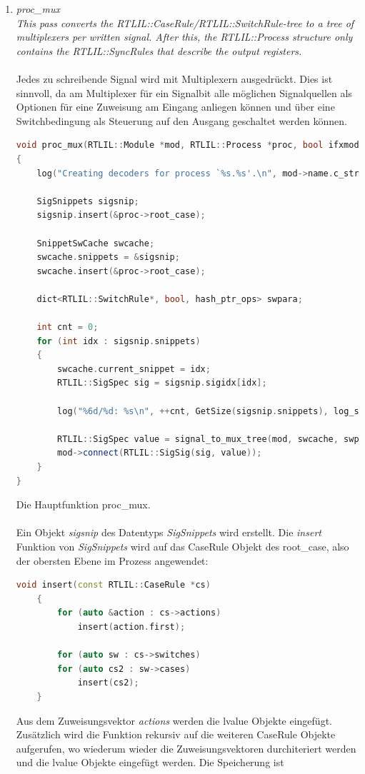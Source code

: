 \documentclass[11pt]{report}
\begin{document}
\begin{enumerate}
\item \textit{proc\_mux\\
This pass converts the RTLIL::CaseRule/RTLIL::SwitchRule-tree to a tree of multiplexers per written signal. After this, the RTLIL::Process structure only contains the RTLIL::SyncRules that describe the output registers.
}
\\
\\
Jedes zu schreibende Signal wird mit Multiplexern ausgedrückt. Dies ist sinnvoll, da am Multiplexer für ein Signalbit alle möglichen Signalquellen als Optionen für eine Zuweisung am Eingang anliegen können und über eine Switchbedingung als Steuerung auf den Ausgang geschaltet werden können.\\
\begin{lstlisting}[language=C++]
void proc_mux(RTLIL::Module *mod, RTLIL::Process *proc, bool ifxmode)
{
	log("Creating decoders for process `%s.%s'.\n", mod->name.c_str(), proc->name.c_str());

	SigSnippets sigsnip;
	sigsnip.insert(&proc->root_case);

	SnippetSwCache swcache;
	swcache.snippets = &sigsnip;
	swcache.insert(&proc->root_case);

	dict<RTLIL::SwitchRule*, bool, hash_ptr_ops> swpara;

	int cnt = 0;
	for (int idx : sigsnip.snippets)
	{
		swcache.current_snippet = idx;
		RTLIL::SigSpec sig = sigsnip.sigidx[idx];

		log("%6d/%d: %s\n", ++cnt, GetSize(sigsnip.snippets), log_signal(sig));

		RTLIL::SigSpec value = signal_to_mux_tree(mod, swcache, swpara, &proc->root_case, sig, RTLIL::SigSpec(RTLIL::State::Sx, sig.size()), ifxmode);
		mod->connect(RTLIL::SigSig(sig, value));
	}
}
\end{lstlisting}
Die Hauptfunktion proc\_mux.
\\
\\
Ein Objekt \textit{sigsnip} des Datentyps \textit{SigSnippets} wird erstellt. Die \textit{insert} Funktion von \textit{SigSnippets} wird auf das CaseRule Objekt des root\_case, also der obersten Ebene im Prozess angewendet:
\begin{lstlisting}[language=C++]
void insert(const RTLIL::CaseRule *cs)
	{
		for (auto &action : cs->actions)
			insert(action.first);

		for (auto sw : cs->switches)
		for (auto cs2 : sw->cases)
			insert(cs2);
	}
\end{lstlisting}
Aus dem Zuweisungsvektor \textit{actions} werden die lvalue Objekte eingefügt.
Zusätzlich wird die Funktion rekursiv auf die weiteren CaseRule Objekte aufgerufen, wo wiederum wieder die Zuweisungsvektoren durchiteriert werden und die lvalue Objekte eingefügt werden. Die Speicherung ist



\end{enumerate}
\end{document}
